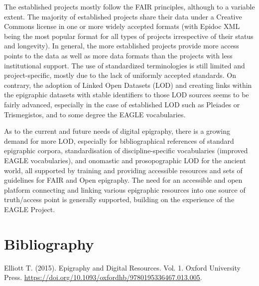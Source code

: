 \documentclass[
]{article}
\newlength{\cslhangindent}
\newlength{\cslentryspacingunit} %
\newenvironment{CSLReferences}[2] %
 {%
  \setlength{\parindent}{0pt}
  \ifodd #1
  \let\oldpar\par
  \def\par{\hangindent=\cslhangindent\oldpar}
  \fi
  \setlength{\parskip}{#2\cslentryspacingunit}
 }%
 {}
\begin{document}
The established projects mostly follow the FAIR principles, although to
a variable extent. The majority of established projects share their data
under a Creative Commons license in one or more widely accepted formats
(with Epidoc XML being the most popular format for all types of projects
irrespective of their status and longevity). In general, the more
established projects provide more access points to the data as well as
more data formats than the projects with less institutional support. The
use of standardized terminologies is still limited and project-specific,
mostly due to the lack of uniformly accepted standards. On contrary, the
adoption of Linked Open Datasets (LOD) and creating links within the
epigraphic datasets with stable identifiers to those LOD sources seems
to be fairly advanced, especially in the case of established LOD such as
Pleiades or Trismegistos, and to some degree the EAGLE vocabularies.

As to the current and future needs of digital epigraphy, there is a
growing demand for more LOD, especially for bibliographical references
of standard epigraphic corpora, standardisation of discipline-specific
vocabularies (improved EAGLE vocabularies), and onomastic and
prosopographic LOD for the ancient world, all supported by training and
providing accessible resources and sets of guidelines for FAIR and Open
epigraphy. The need for an accessible and open platform connecting and
linking various epigraphic resources into one source of truth/access
point is generally supported, building on the experience of the EAGLE
Project.

\hypertarget{bibliography}{%
\section{Bibliography}\label{bibliography}}

\hypertarget{refs}{}
\begin{CSLReferences}{1}{0}
\leavevmode{}%
Elliott T. (2015). Epigraphy and {Digital} {Resources}. Vol. 1. Oxford
University Press.
\url{https://doi.org/10.1093/oxfordhb/9780195336467.013.005}.

\end{CSLReferences}
\end{document}
